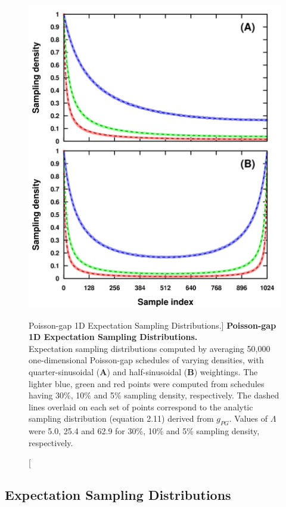 \begin{figure}[ht!]
\begin{center}
  \includegraphics[width=5in]{figs/dgs/02-expect-1d.png}
\end{center}
\caption
      [Poisson-gap 1D Expectation Sampling Distributions.]{
  {\bf Poisson-gap 1D Expectation Sampling Distributions.}
  \\
  Expectation sampling distributions computed by averaging 50,000
  one-dimensional Poisson-gap schedules of varying densities, with
  quarter-sinusoidal ({\bf A}) and half-sinusoidal ({\bf B}) weightings.
  The lighter blue, green and red points were computed from schedules having
  30\%, 10\% and 5\% sampling density, respectively. The dashed lines overlaid
  on each set of points correspond to the analytic sampling distribution
  (equation 2.11) derived from $g_{PG}$. Values of $\Lambda$ were 5.0, 25.4
  and 62.9 for 30\%, 10\% and 5\% sampling density, respectively.
}
\end{figure}

\subsection{Expectation Sampling Distributions}

